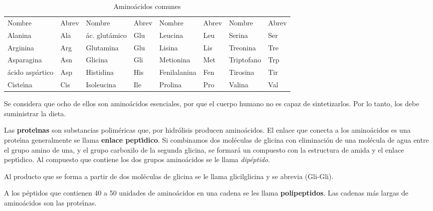 \begin{table}[hbt]
\caption{Amino\'acidos comunes}
\label{aminoa}
{\footnotesize \begin{tabular}{llllllll}
&\\\hline
Nombre&{\tiny Abrev}&Nombre&{\tiny
Abrev}&Nombre&{\tiny Abrev}&Nombre&{\tiny Abrev}\\\hline Alanina   &Ala& \'ac.
glut\'amico&Glu & Leucina &Leu& Serina&Ser\\ Arginina  &Arg&
Glutamina          &Glu& Lisina   &Lis& Treonina&Tre\\ Asparagina&Asn&
Glicina            &Gli& Metionina&Met& Triptofano&Trp\\
\'acido asp\'artico&Asp&Histidina  &His& Fenilalanina&Fen& Tirosina&Tir\\
Ciste\'{\i}na&Cis& Isoleucina      &Ile& Prolina  &Pro& Valina&Val\\
\hline
\end{tabular}}
\end{table}

Se considera que ocho de ellos son amino\'acidos esenciales, por que el cuerpo humano no es capaz de sintetizarlos. Por lo tanto, los debe
suministrar la dieta.

Las \textbf{prote\'{\i}nas}  son substancias polim\'ericas que, por hidr\'olisis producen ami\-no\-\'acidos. El enlace  que conecta a los amino\'acidos es una prote\'{\i}na generalmente se llama \textbf{enlace pept\'{\i}dico}.  Si combinamos dos mol\'eculas de glicina con eliminaci\'on de una mol\'ecula de agua entre el grupo amino de una, y el grupo carboxilo de la segunda glicina, se formar\'a un compuesto con la estructura de amida y el enlace pept\'{\i}dico. Al compuesto que contiene los dos grupos amino\'acidos se le llama \textit{dip\'eptido}.

Al producto que se forma a partir de dos mol\'eculas de glicina se le llama glicilglicina  y se abrevia (Gli-Gli).

A los p\'eptidos que contienen 40 a 50 unidades de amino\'acidos en una cadena se les llama \textbf{\gls{polipeptidos}}. Las cadenas m\'as largas de amino\'acidos son las prote\'{\i}nas.





 
